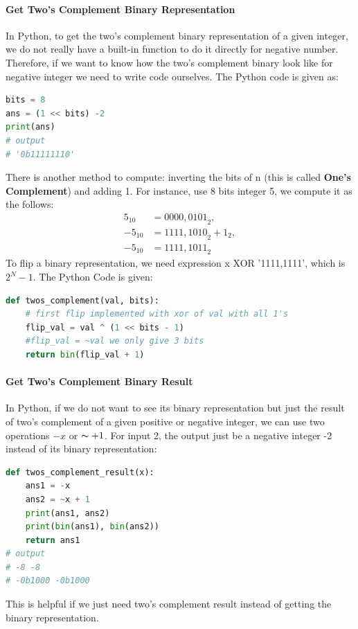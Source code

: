 \documentclass[../main.tex]{subfiles}
\begin{document}
\paragraph{Get Two's Complement Binary Representation}
In Python, to get the two's complement binary representation of a given integer, we do not really have a built-in function to do it directly for negative number. Therefore, if we want to know how the two's complement binary look like for negative integer we need to write code ourselves. The Python code is given as:
\begin{lstlisting}[language=Python]
bits = 8
ans = (1 << bits) -2
print(ans)
# output
# '0b11111110'
\end{lstlisting}
There is another method to compute: inverting the bits of n (this is called \textbf{One's Complement}) and adding 1. For instance, use 8 bits integer 5, we compute it as the follows:
\begin{align}
\label{five}
    5_{10} &= {0000, 0101}_2, \\
    {-5}_{10} &= {1111, 1010}_2 + 1_2, \\ 
    {-5}_{10} &= {1111, 1011}_2
\label{five_complement}
\end{align}
To flip a binary representation, we need expression x XOR '1111,1111', which is $2^N-1$. The Python Code is given:
\begin{lstlisting}[language=Python]
def twos_complement(val, bits):
    # first flip implemented with xor of val with all 1's
    flip_val = val ^ (1 << bits - 1)
    #flip_val = ~val we only give 3 bits
    return bin(flip_val + 1)
\end{lstlisting}

\paragraph{Get Two's Complement Binary Result}
In Python, if we do not want to see its binary representation but just the result of two's complement of a given positive or negative integer, we can use two operations $-x$ or $\thicksim +1$. For input 2, the output just be a negative integer -2 instead of its binary representation:
\begin{lstlisting}[language=Python]
def twos_complement_result(x):
    ans1 = -x
    ans2 = ~x + 1
    print(ans1, ans2)
    print(bin(ans1), bin(ans2))
    return ans1
# output
# -8 -8
# -0b1000 -0b1000
\end{lstlisting}
This is helpful if we just need two's complement result instead of getting the binary representation. 
\end{document}
